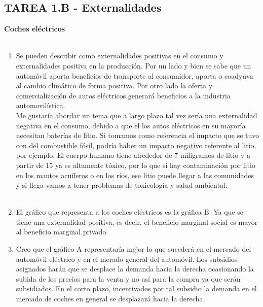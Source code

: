 \subsection*{\center TAREA 1.B - Externalidades}
\vspace{1cm}
\textbf{Coches eléctricos}\\\\
\begin{enumerate}

    \item Se pueden describir como externalidades positivas en el consumo y externalidades positiva en la producción. Por un lado y bien se sabe que un automóvil aporta beneficios de transporte al consumidor, aporta o coadyuva al cambio climático de forma positiva. Por otro lado la oferta y comercialización de autos eléctricos generará beneficios a la industria automovilística.\\
    Me gustaría abordar un tema que a largo plazo tal vez sería una externalidad negativa en el consumo, debido a que el los autos eléctricos en su mayoría necesitan baterías de litio. Si tomamos como referencia el impacto que se tuvo con del combustible fósil, podría haber un impacto negativo  referente al litio, por ejemplo: El cuerpo humano tiene alrededor de 7 miligramos de litio y a partir de 15 ya es altamente tóxico, por lo que si hay contaminación por litio en los mantos acuíferos o en los ríos, ese litio puede llegar a las comunidades y si llega vamos a tener problemas de toxicología y salud ambiental.\\\\

    \item El gráfico que representa a los coches eléctricos es la gráfica B. Ya que se tiene una externalidad positiva, es decir, el beneficio marginal social es mayor al beneficio marginal privado.\\

    \item Creo que el gráfico A representaría mejor lo que sucederá en el mercado del automóvil eléctrico y en el merado general del automóvil. Los subsidios asignados harán que se desplace la demanda hacia la derecha ocasionando la subida de los precios para la venta y no así para la compra ya que serán subsidiados. En el corto plazo, incentivados por tal subsidio la demanda en el mercado de coches en general se desplazará hacia la derecha.\\\\


\end{enumerate}
